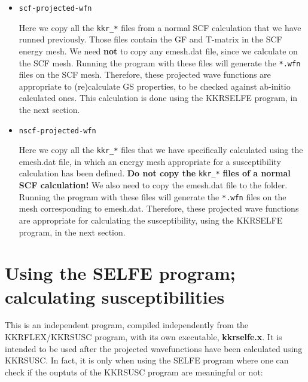 \documentclass[11pt,fleqn]{book} %
\begin{document}
\begin{itemize}

\item \verb|scf-projected-wfn|

Here we copy all the \verb|kkr_*| files from a normal SCF calculation
that we have runned previously. Those files contain the GF and T-matrix
in the SCF energy mesh. We need \textbf{not} to copy any emesh.dat file,
since we calculate on the SCF mesh. Running the program with these files
will generate the \verb|*.wfn|
files on the SCF mesh. Therefore, these projected wave functions are appropriate
to (re)calculate GS properties, to be checked against ab-initio calculated ones.
This calculation is done using the KKRSELFE program, in the next section.

\item \verb|nscf-projected-wfn|

Here we copy all the \verb|kkr_*| files that we have specifically
calculated using the emesh.dat file, in which an energy mesh appropriate
for a susceptibility calculation has been defined.
\textbf{Do not copy the} \verb|kkr_*| \textbf{files of a normal SCF calculation!}
We also need to copy the
emesh.dat file to the folder. Running the program with these files
will generate the \verb|*.wfn|
files on the mesh corresponding to emesh.dat. Therefore, these projected wave
functions are appropriate for calculating the susceptibility,
using the KKRSELFE program, in the next section.

\end{itemize}



\section{Using the SELFE  program; calculating susceptibilities}

This is an independent program, compiled independently from the KKRFLEX/KKRSUSC program,
with its own executable, \textbf{kkrselfe.x}. It is intended to be used after the
projected wavefunctions have been calculated using KKRSUSC. In fact,
it is only when using the SELFE program where one can check if the ouptuts
of the KKRSUSC program are meaningful or not:
\end{document}
